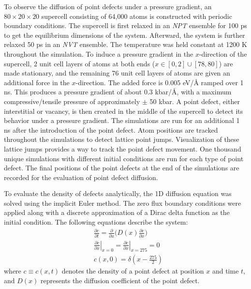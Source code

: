 \documentclass[review]{elsarticle}
\begin{document}
To observe the diffusion of point defects under a pressure gradient, an $80 \times 20 \times 20$ supercell consisting of 64,000 atoms is constructed with periodic boundary conditions. The supercell is first relaxed in an \textit{NPT} ensemble for 100 ps to get the equilibrium dimensions of the system. Afterward, the system is further relaxed 50 ps in an \textit{NVT} ensemble. The temperature was held constant at 1200 K throughout the simulation. To induce a pressure gradient in the $x$-direction of the supercell, 2 unit cell layers of atoms at both ends ($x \in [0, 2] \cup [78, 80]$) are made stationary, and the remaining 76 unit cell layers of atoms are given an additional force in the $x$-direction. The added force is 0.005 eV/\r{A} ramped over 1 ns. This produces a pressure gradient of about 0.3 kbar/\r{A}, with a maximum compressive/tensile pressure of approximately $\pm$ 50 kbar. A point defect, either interstitial or vacancy, is then created in the middle of the supercell to detect its behavior under a pressure gradient. The simulations are run for an additional 1 ns after the introduction of the point defect. Atom positions are tracked throughout the simulations to detect lattice point jumps. Visualization of these lattice jumps provides a way to track the point defect movement. One thousand unique simulations with different initial conditions are run for each type of point defect. The final positions of the point defects at the end of the simulations are recorded for the evaluation of point defect diffusion.

To evaluate the density of defects analytically, the 1D diffusion equation was solved using the implicit Euler method. The zero flux boundary conditions were applied along with a discrete approximation of a Dirac delta function as the initial condition. The following equations describe the system:
\begin{align} \label{eq:1D_diff}
    &\frac{\partial c}{\partial t}
    = \frac{\partial}{\partial x} \bigg(
        D(x) \frac{\partial c}{\partial x}
    \bigg) \\
    &\left. \frac{\partial c}{\partial x} \right|_{x=0}
    = \left. \frac{\partial c}{\partial x} \right|_{x=275}
    = 0 \\
    &c(x, 0) = \delta\left(x-\frac{275}{2}\right)
\end{align}
where $c \equiv c(x, t)$ denotes the density of a point defect at position $x$ and time $t$, and $D(x)$ represents the diffusion coefficient of the point defect. 
\end{document}
